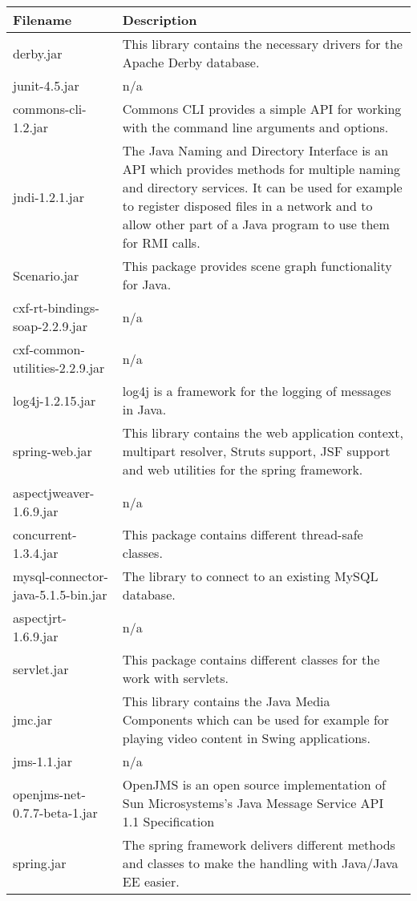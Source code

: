 \begin{center}
\begin{longtable}{|p{}|p{}|}
\hline 
Filename & Description\\
\hline
\hline 
derby.jar & This library contains the necessary drivers for the Apache Derby database.\\
\hline 
junit-4.5.jar & n/a\\
\hline 
commons-cli-1.2.jar & Commons CLI provides a simple API for working with the command line arguments and options.\\
\hline 
jndi-1.2.1.jar & The Java Naming and Directory Interface is an API which provides methods for multiple naming and directory services. It can be used for example to register disposed files in a network and to allow other part of a Java program to use them for RMI calls.\\
\hline 
Scenario.jar & This package provides scene graph functionality for Java.\\
\hline 
cxf-rt-bindings-soap-2.2.9.jar & n/a\\
\hline 
cxf-common-utilities-2.2.9.jar & n/a\\
\hline 
log4j-1.2.15.jar & log4j is a framework for the logging of messages in Java.\\
\hline 
spring-web.jar & This library contains the web application context, multipart resolver, Struts support, JSF support and web utilities for the spring framework.\\
\hline 
aspectjweaver-1.6.9.jar & n/a\\
\hline 
concurrent-1.3.4.jar & This package contains different thread-safe classes.\\
\hline 
mysql-connector-java-5.1.5-bin.jar & The library to connect to an existing MySQL database.\\
\hline 
aspectjrt-1.6.9.jar & n/a\\
\hline 
servlet.jar & This package contains different classes for the work with servlets.\\
\hline 
jmc.jar & This library contains the Java Media Components which can be used for example for playing video content in Swing applications.\\
\hline 
jms-1.1.jar & n/a\\
\hline 
openjms-net-0.7.7-beta-1.jar & OpenJMS is an open source implementation of Sun Microsystems's Java Message Service API 1.1 Specification\\
\hline 
spring.jar & The spring framework delivers different methods and classes to make the handling with Java/Java EE easier.\\

\end{longtable}
\end{center}

